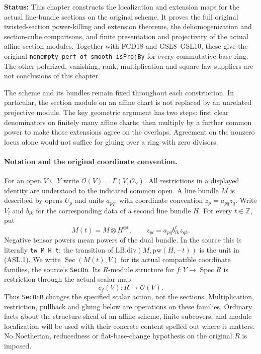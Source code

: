 \documentclass[11pt,a4paper]{article}
\numberwithin{equation}{section}
\theoremstyle{remark}\newtheorem{remark}[theorem]{Remark}
\newcommand{\status}[1]{\textbf{Status:} #1}
\begin{document}
\status{This chapter constructs the localization and extension maps for
the actual line-bundle sections on the original scheme.  It proves the
full original twisted-section power-killing and extension theorems,
the dehomogenization and section-cube comparisons, and finite
presentation and projectivity of the actual affine section modules.
Together with FCD18 and GSL8--GSL10, these give the original
\texttt{nonempty\_\allowbreak{}perf\_\allowbreak{}of\_\allowbreak{}smooth\_\allowbreak{}is\allowbreak{}Proj\allowbreak{}By} for every commutative
base ring.  The other polarized, vanishing, rank, multiplication and
square-law suppliers are not conclusions of this chapter.}

The scheme and its bundles remain fixed throughout each construction.
In particular, the section module on an affine chart is not replaced
by an unrelated projective module.  The key geometric argument has two
steps: first clear denominators on finitely many affine charts; then
multiply by a further common power to make those extensions agree on
the overlaps.  Agreement on the nonzero locus alone would not suffice
for gluing over a ring with zero divisors.

\paragraph{Notation and the original coordinate convention.}
For an open $V\subseteq Y$ write $\mathcal O(V)=\Gamma(V,\mathcal O_Y)$.
All restrictions in a displayed identity are understood to the indicated
common open.  A line bundle $M$ is described by opens $U_p$ and units
$a_{pq}$, with coordinate convention $z_p=a_{pq}z_q$.
Write $V_l$ and $b_{lk}$ for the corresponding data of a second
line bundle $H$.  For every $t\in\mathbb Z$, put
\[
 M(t)=M\otimes H^{\otimes t},\qquad
 z_{pl}=a_{pq}b_{lk}^{t}z_{qk}.                 \tag{ASL.1}
\]
Negative tensor powers mean powers of the dual bundle.  In the source
this is literally \texttt{tw M H t}: the transition of
$\mathrm{LB.div}(M,\mathrm{pw}(H,-t))$ is the unit in (ASL.1).
We write $\operatorname{Sec}(M(t),V)$ for its actual compatible
coordinate families, the source's \texttt{Sec\allowbreak{}On}.  Its $R$-module
structure for $f:Y\to\operatorname{Spec}R$ is restriction through
the actual scalar map
\[
 c_f(V):R\longrightarrow\mathcal O(V).
                                                        \tag{ASL.2}
\]
Thus \texttt{Sec\allowbreak{}On\allowbreak{}R} changes the specified scalar action, not the sections.
Multiplication, restriction, pullback and gluing below are operations on
these families.  Ordinary facts about the structure sheaf of an affine
scheme, finite subcovers, and module localization will be used with
their concrete content spelled out where it matters.  No Noetherian,
reducedness or flat-base-change hypothesis on the original $R$ is imposed.
\end{document}
